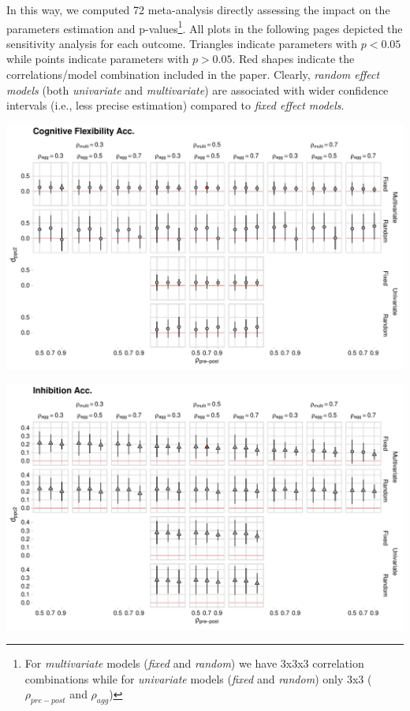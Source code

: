 \documentclass[
]{article}
\begin{document}
In this way, we computed 72 meta-analysis directly assessing the impact on the parameters estimation and p-values\footnote{For \emph{multivariate} models (\emph{fixed} and \emph{random}) we have 3x3x3 correlation combinations while for \emph{univariate} models (\emph{fixed} and \emph{random}) only 3x3 (\(\rho_{pre-post}\) and \(\rho_{agg}\))}. All plots in the following pages depicted the sensitivity analysis for each outcome. Triangles indicate parameters with \(p < 0.05\) while points indicate parameters with \(p > 0.05\). Red shapes indicate the correlations/model combination included in the paper. Clearly, \emph{random effect models} (both \emph{univariate} and \emph{multivariate}) are associated with wider confidence intervals (i.e., less precise estimation) compared to \emph{fixed effect models}.

\begin{landscape}




\begin{center}\includegraphics[width=648px]{supplementary_files/figure-latex/cognitive-flexibility-acc-plot-1} \end{center}


\begin{center}\includegraphics[width=648px]{supplementary_files/figure-latex/inhibition-accuracy-plot-1} \end{center}



\end{landscape}
\end{document}
